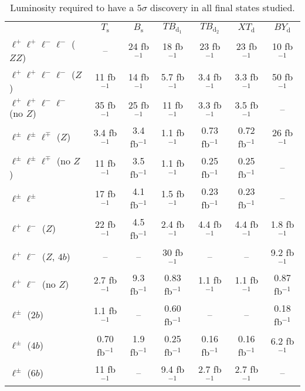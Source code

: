 \documentclass[12pt,a4paper]{article}
\newcommand{\fbin}{fb$^{-1}$}
\newcommand{\Ts}{T_\text{s}}
\newcommand{\Bs}{B_\text{s}}
\newcommand{\TBd}{TB_{\text{d}_1}}
\newcommand{\TBD}{TB_{\text{d}_2}}
\newcommand{\XTd}{XT_\text{d}}
\newcommand{\BYd}{BY_\text{d}}
\begin{document}
\begin{table}[ht]
\begin{center}
\begin{small}
\begin{tabular}{lcccccc}
       & $\Ts$      & $\Bs$     & $\TBd$     & $\TBD$     & $\XTd$     & $\BYd$ \\
$\ell^+ \ell^+ \ell^- \ell^-$ ($ZZ$)
       & --         & 24 \fbin  & 18 \fbin   & 23 \fbin   & 23 \fbin   & 10 \fbin \\ 
$\ell^+ \ell^+ \ell^- \ell^-$ ($Z$) 
       & 11 \fbin   & 14 \fbin  & 5.7 \fbin  & 3.4 \fbin  & 3.3 \fbin  & 50 \fbin \\ 
$\ell^+ \ell^+ \ell^- \ell^-$ (no $Z$) 
       & 35 \fbin   & 25 \fbin  & 11 \fbin   & 3.3 \fbin  & 3.5 \fbin  & -- \\ 
$\ell^\pm \ell^\pm \ell^\mp$ ($Z$) 
       & 3.4 \fbin  & 3.4 \fbin & 1.1 \fbin  & 0.73 \fbin & 0.72 \fbin & 26 \fbin \\ 
$\ell^\pm \ell^\pm \ell^\mp$ (no $Z$) 
       & 11 \fbin   & 3.5 \fbin & 1.1 \fbin  & 0.25 \fbin & 0.25 \fbin & -- \\ 
$\ell^\pm \ell^\pm$ 
       & 17 \fbin   & 4.1 \fbin & 1.5 \fbin  & 0.23 \fbin & 0.23 \fbin & -- \\ 
$\ell^+ \ell^-$ ($Z$) 
       & 22 \fbin   & 4.5 \fbin & 2.4 \fbin  & 4.4 \fbin  & 4.4 \fbin  & 1.8 \fbin \\ 
$\ell^+ \ell^-$ ($Z$, $4b$) 
       & --         & --        & 30  \fbin  & --         & --         & 9.2 \fbin \\ 
$\ell^+ \ell^-$ (no $Z$) 
       & 2.7 \fbin  & 9.3 \fbin & 0.83 \fbin & 1.1 \fbin  & 1.1 \fbin  & 0.87 \fbin \\ 
$\ell^\pm$ ($2b$) 
       & 1.1 \fbin  & --        & 0.60 \fbin & --         & --         & 0.18 \fbin \\ 
$\ell^\pm$ ($4b$) 
       & 0.70 \fbin & 1.9 \fbin & 0.25 \fbin & 0.16 \fbin & 0.16 \fbin & 6.2 \fbin \\ 
$\ell^\pm$ ($6b$) 
       & 11  \fbin  & --        & 9.4 \fbin  & 2.7 \fbin  & 2.7  \fbin & -- \\ 
\end{tabular}
\end{small}
\end{center}
\caption{Luminosity required to have a $5\sigma$ discovery in all final states studied.}
\label{tab:summ}
\end{table}
\end{document}
